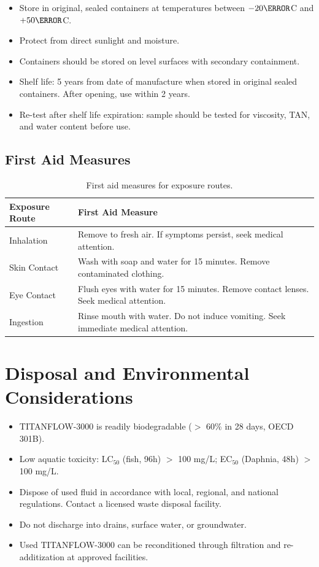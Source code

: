 \documentclass[
    language=english,
    doctype=data-sheet,
    institution=none,
]{../../omnilatex}
\begin{document}
\begin{itemize}
    \item Store in original, sealed containers at temperatures between
          $-20\degree$C and $+50\degree$C.
    \item Protect from direct sunlight and moisture.
    \item Containers should be stored on level surfaces with secondary
          containment.
    \item Shelf life: 5 years from date of manufacture when stored in
          original sealed containers. After opening, use within 2 years.
    \item Re-test after shelf life expiration: sample should be tested
          for viscosity, TAN, and water content before use.
\end{itemize}

\subsection{First Aid Measures}

\begin{table}[htbp]
    \centering
    \caption{First aid measures for exposure routes.}
    \label{tab:first-aid}
    \begin{tabular}{@{}p{3cm}p{11cm}@{}}
        \toprule
        Exposure Route & First Aid Measure \\
        \midrule
        Inhalation & Remove to fresh air. If symptoms persist, seek medical attention. \\
        Skin Contact & Wash with soap and water for 15 minutes. Remove contaminated clothing. \\
        Eye Contact & Flush eyes with water for 15 minutes. Remove contact lenses. Seek medical attention. \\
        Ingestion & Rinse mouth with water. Do not induce vomiting. Seek immediate medical attention. \\
        \bottomrule
    \end{tabular}
\end{table}

\section{Disposal and Environmental Considerations}
\label{sec:disposal}

\begin{itemize}
    \item TITANFLOW-3000 is readily biodegradable ($>$ 60\% in 28 days,
          OECD 301B).
    \item Low aquatic toxicity: LC$_{50}$ (fish, 96h) $>$ 100 mg/L;
          EC$_{50}$ (Daphnia, 48h) $>$ 100 mg/L.
    \item Dispose of used fluid in accordance with local, regional, and
          national regulations. Contact a licensed waste disposal facility.
    \item Do not discharge into drains, surface water, or groundwater.
    \item Used TITANFLOW-3000 can be reconditioned through filtration and
          re-additization at approved facilities.
\end{itemize}
\end{document}
